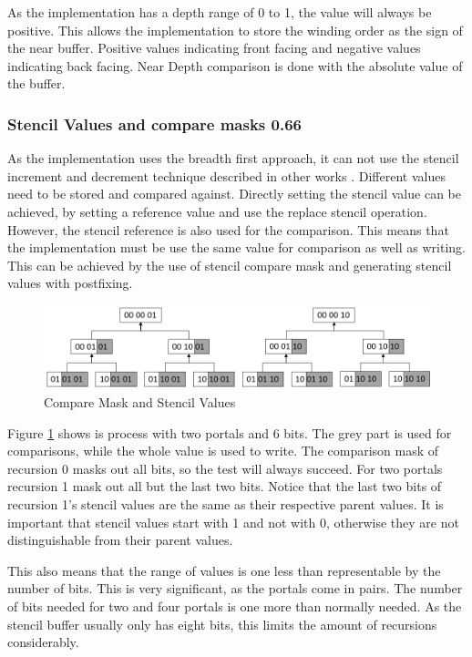 As the implementation has a depth range of 0 to 1, the value will always be positive. This allows the implementation to store the winding order as the sign of the near buffer. Positive values indicating front facing and negative values indicating back facing. Near Depth comparison is done with the absolute value of the buffer.

\subsubsection{Stencil Values and compare masks 0.66}
\label{section:stencilcomparemasks}

As the implementation uses the breadth first approach, it can not use the stencil increment and decrement technique described in other works \cite{schmalstieg:1999:sewing, lowe:2003:fragment, lecture:portalProblems}. Different values need to be stored and compared against. Directly setting the stencil value can be achieved, by setting a reference value and use the replace stencil operation. However, the stencil reference is also used for the comparison. This means that the implementation must be use the same value for comparison as well as writing. This can be achieved by the use of stencil compare mask and generating stencil values with postfixing.

\begin{figure}[h]
	\includegraphics[width=\linewidth]{images/stencilvalues2.png}
	\caption{Compare Mask and Stencil Values}
	\label{fig:stencilvalues}
\end{figure}

Figure \ref{fig:stencilvalues} shows is process with two portals and 6 bits. The grey part is used for comparisons, while the whole value is used to write. The comparison mask of recursion 0 masks out all bits, so the test will always succeed. For two portals recursion 1 mask out all but the last two bits. Notice that the last two bits of  recursion 1's stencil values are the same as their respective parent values. It is important that stencil values start with 1 and not with 0, otherwise they are not distinguishable from their parent values.

This also means that the range of values is one less than representable by the number of bits. This is very significant, as the portals come in pairs. The number of bits needed for two and four portals is one more than normally needed. As the stencil buffer usually only has eight bits, this limits the amount of recursions considerably.



